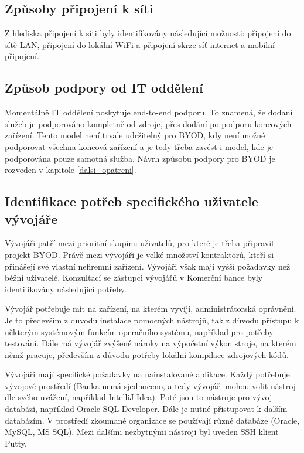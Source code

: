 \subsection{Způsoby připojení k síti}
Z hlediska připojení k síti byly identifikovány následující možnosti: připojení do sítě LAN, připojení do lokální WiFi a připojení skrze síť internet a mobilní připojení.

\subsection{Způsob podpory od IT oddělení}
Momentálně IT oddělení poskytuje end-to-end podporu. To znamená, že dodaní služeb je podporováno kompletně od zdroje, přes dodání po podporu koncových zařízení. Tento model není trvale udržitelný pro BYOD, kdy není možné podporovat všechna koncová zařízení a je tedy třeba zavést i model, kde je podporována pouze samotná služba. Návrh způsobu podpory pro BYOD je rozveden v kapitole \ref{dalsi_opatreni}.

\subsection{Identifikace potřeb specifického uživatele -- vývojáře}\label{potreby_vyvojar}
Vývojáři patří mezi prioritní skupinu uživatelů, pro které je třeba připravit projekt BYOD. Právě mezi vývojáři je velké množství kontraktorů, kteří si přinášejí své vlastní nefiremní zařízení. Vývojáři však mají vyšší požadavky než běžní uživatelé. Konzultací se zástupci vývojářů v Komerční bance byly identifikovány následující potřeby. 

Vývojář potřebuje mít na zařízení, na kterém vyvíjí, administrátorská oprávnění. Je to především z důvodu instalace pomocných nástrojů, tak z důvodu přístupu k některým systémovým funkcím operačního systému, například pro potřeby testování. Dále má vývojář zvýšené nároky na výpočetní výkon stroje, na kterém němž pracuje, především z důvodu potřeby lokální kompilace zdrojových kódů. 

Vývojáři mají specifické požadavky na nainstalované aplikace. Každý potřebuje vývojové prostředí (Banka nemá sjednoceno, a tedy vývojáři mohou volit nástroj dle svého uvážení, například IntelliJ Idea). Poté jsou to nástroje pro vývoj databází, například Oracle SQL Developer. Dále je nutné přistupovat k dalším databázím. V prostředí zkoumané organizace se používají různé databáze (Oracle, MySQL, MS SQL). Mezi dalšími nezbytnými nástroji byl uveden SSH klient Putty.

